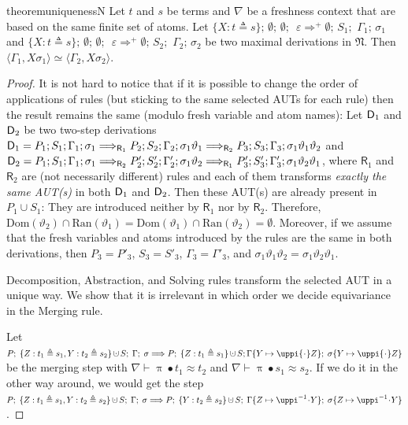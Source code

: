 \documentclass[11pt,a4paper]{amsart}
\theoremstyle{definition}
\newcommand{\dom}{\mathrm{Dom}}
\newcommand{\ran}{\mathrm{Ran}}
\newcommand{\Lra}{\Longrightarrow}
\newcommand{\frN}{\mathfrak N}
\newcommand{\permap}{{\mkern 1mu\cdot \mkern 1mu}}
\newcommand{\permef}{\bullet}
\newcommand\ppi{\uppi}
\newcommand{\dotcup}{\ensuremath{\mathop{\mathaccent\cdot\cup}}}
\newcommand{\np}[2]{\langle #1, \allowbreak #2\rangle}
\newcommand{\nablag}{\Gamma}
\begin{document}
\begin{restatable}{theorem}{uniquenessN}
  \label{thm:uniqueness}
  Let $t$ and $s$ be terms and $\nabla$ be a freshness context that are based on the same finite set of atoms.
  Let $\{X: t\triangleq s\};\, \emptyset;\, \emptyset;\, $
  $\varepsilon \Lra^+ \emptyset;\,S_1;$ $ \nablag_1;\, \sigma_1$ and
  $\{X: t\triangleq s\};\, \emptyset;\, \emptyset;\, $ $\varepsilon
  \Lra^+ \emptyset;\,S_2;$ $ \nablag_2;\, \sigma_2$ be two maximal
  derivations in $\frN$. Then $\np{\nablag_1}{X\sigma_1}\simeq
  \np{\nablag_2}{X\sigma_2}$.
\end{restatable}


\begin{proof}
It is not hard to notice that if it is possible to change the order of
applications of rules (but sticking to the same selected AUTs for each
rule) then the result remains the same (modulo fresh variable and atom names): Let ${\sf D}_1$ and ${\sf D}_2$ be two two-step derivations ${\sf D}_1 =
P_1;S_1;\Gamma_1;\sigma_1 \Lra_{\mathsf{R}_1} P_2;S_2;\Gamma_2;\sigma_1\vartheta_1
\Lra_{\mathsf{R}_2} P_3; S_3; \Gamma_3; \sigma_1\vartheta_1\vartheta_2$ and
${\sf D}_2= P_1;S_1;\Gamma_1;\sigma_1 \Lra_{\mathsf{R}_2}
P'_2;S'_2;\Gamma'_2;\sigma_1\vartheta_2 \Lra_{\mathsf{R}_1} P'_3; S'_3;\allowbreak\Gamma'_3;
\sigma_1\vartheta_2\vartheta_1$, where
$\mathsf{R}_1$ and $\mathsf{R}_2$ are (not necessarily different) rules and
each of them transforms \emph{exactly the same AUT(s)} in both ${\sf D}_1$ and
${\sf D}_2$. Then these AUT(s) are already present in $P_1\cup S_1$: They are introduced neither by $\mathsf{R}_1$ nor by $\mathsf{R}_2$. Therefore, $\dom(\vartheta_2)\cap \ran(\vartheta_1) = \dom(\vartheta_1)\cap \ran(\vartheta_2) = \emptyset$. Moreover, if we assume that the fresh variables and atoms introduced by the rules are the same in both derivations, then $P_3=P'_3$, $S_3=S'_3$, $\Gamma_3=\Gamma'_3$, and $\sigma_1\vartheta_1\vartheta_2=\sigma_1\vartheta_2\vartheta_1$.

Decomposition, Abstraction, and Solving rules transform the selected AUT in a unique way. We show that it is irrelevant in which order we decide equivariance in the Merging rule.

Let $P ;\; \{Z : t_1 \triangleq s_1, Y : t_2 \triangleq s_2\}\dotcup S ;\; \Gamma;\; \sigma \Lra P ;\; \{Z : t_1 \triangleq s_1\}\dotcup S ;\allowbreak \Gamma \{Y\mapsto \ppi \permap Z\};\; \sigma\{Y \mapsto \ppi \permap Z\} $ be the merging step with $\nabla \vdash \ppi\permef t_1\approx t_2$ and $\nabla \vdash \ppi\permef s_1\approx s_2$. If we do it in the other way around, we would get the step $P ;\; \{Z : t_1 \triangleq s_1, Y : t_2 \triangleq s_2\}\dotcup S ;\; \Gamma;\; \sigma \Lra P ;\; \{Y : t_2 \triangleq s_2\}\dotcup S ;\; \Gamma\{Z\mapsto \ppi^{-1} \permap Y\};\; \sigma\{Z \mapsto \ppi^{-1} \permap Y\} $.


\end{proof}
\end{document}

